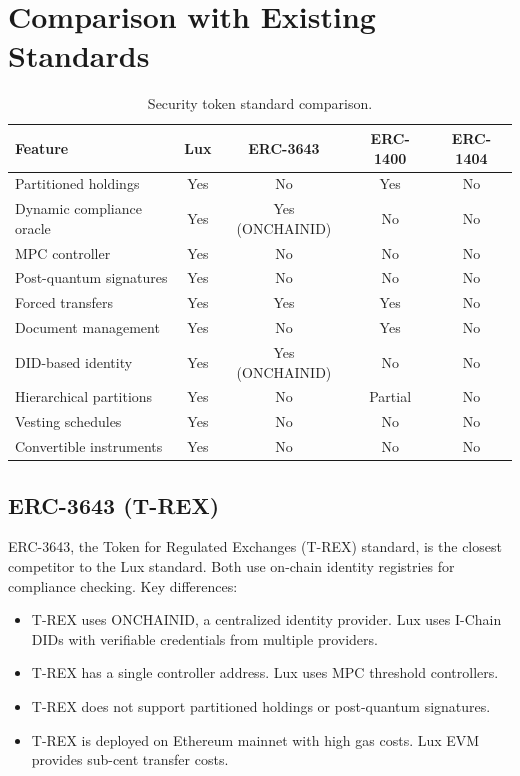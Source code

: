 \section{Comparison with Existing Standards}
\label{sec:comparison}

\begin{table}[H]
\centering
\caption{Security token standard comparison.}
\label{tab:standard-comparison}
\begin{tabular}{lcccc}
\toprule
\textbf{Feature} & \textbf{Lux} & \textbf{ERC-3643} & \textbf{ERC-1400} & \textbf{ERC-1404} \\
\midrule
Partitioned holdings & Yes & No & Yes & No \\
Dynamic compliance oracle & Yes & Yes (ONCHAINID) & No & No \\
MPC controller & Yes & No & No & No \\
Post-quantum signatures & Yes & No & No & No \\
Forced transfers & Yes & Yes & Yes & No \\
Document management & Yes & No & Yes & No \\
DID-based identity & Yes & Yes (ONCHAINID) & No & No \\
Hierarchical partitions & Yes & No & Partial & No \\
Vesting schedules & Yes & No & No & No \\
Convertible instruments & Yes & No & No & No \\
\bottomrule
\end{tabular}
\end{table}

\subsection{ERC-3643 (T-REX)}

ERC-3643, the Token for Regulated Exchanges (T-REX) standard, is the closest competitor to the Lux standard. Both use on-chain identity registries for compliance checking. Key differences:

\begin{itemize}[nosep]
  \item T-REX uses ONCHAINID, a centralized identity provider. Lux uses I-Chain DIDs with verifiable credentials from multiple providers.
  \item T-REX has a single controller address. Lux uses MPC threshold controllers.
  \item T-REX does not support partitioned holdings or post-quantum signatures.
  \item T-REX is deployed on Ethereum mainnet with high gas costs. Lux EVM provides sub-cent transfer costs.
\end{itemize}

